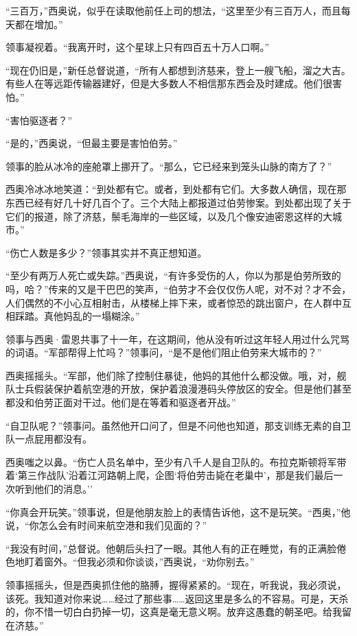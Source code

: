 \documentclass[AutoFakeBold=true]{book}
\begin{document}
``三百万，''西奥说，似乎在读取他前任上司的想法，``这里至少有三百万人，而且每天都在增加。''

领事凝视着。``我离开时，这个星球上只有四百五十万人口啊。''

``现在仍旧是，''新任总督说道，``所有人都想到济慈来，登上一艘飞船，溜之大吉。有些人在等远距传输器建好，但是大多数人不相信那东西会及时建成。他们很害怕。''

``害怕驱逐者？''

``是的，''西奥说，``但最主要是害怕伯劳。''

领事的脸从冰冷的座舱罩上挪开了。``那么，它已经来到笼头山脉的南方了？''

西奥冷冰冰地笑道：``到处都有它。或者，到处都有它们。大多数人确信，现在那东西已经有好几十好几百个了。三个大陆上都报道过伯劳惨案。到处都出现了关于它们的报道，除了济慈，鬃毛海岸的一些区域，以及几个像安迪密恩这样的大城市。''

``伤亡人数是多少？''领事其实并不真正想知道。

``至少有两万人死亡或失踪。''西奥说，``有许多受伤的人，你以为那是伯劳所致的吗，哈？''传来的又是干巴巴的笑声，``伯劳才不会仅仅伤人呢，对不对？才不会，人们偶然的不小心互相射击，从楼梯上摔下来，或者惊恐的跳出窗户，在人群中互相踩踏。真他妈乱的一塌糊涂。''

领事与西奥·雷恩共事了十一年，在这期间，他从没有听过这年轻人用过什么咒骂的词语。``军部帮得上忙吗？''领事问，``是不是他们阻止伯劳来大城市的？''

西奥摇摇头。``军部，他们除了控制住暴徒，他妈的其他什么都没做。哦，对，舰队士兵假装保护着航空港的开放，保护着浪漫港码头停放区的安全。但是他们甚至都没和伯劳正面对干过。他们是在等着和驱逐者开战。''

``自卫队呢？''领事问。虽然他开口问了，但是不问他也知道，那支训练无素的自卫队一点屁用都没有。

西奥嗤之以鼻。``伤亡人员名单中，至少有八千人是自卫队的。布拉克斯顿将军带着`第三作战队'沿着江河路朝上爬，企图`将伯劳击毙在老巢中'，那是我们最后一次听到他们的消息。''

``你真会开玩笑。''领事说，但是他朋友脸上的表情告诉他，这不是玩笑。``西奥，''他说，``你怎么会有时间来航空港和我们见面的？''

``我没有时间，''总督说。他朝后头扫了一眼。其他人有的正在睡觉，有的正满脸倦色地盯着窗外。``但我必须和你谈谈，''西奥说，``劝你别去。''

领事摇摇头，但是西奥抓住他的胳膊，握得紧紧的。``现在，听我说，我必须说，该死。我知道对你来说……经过了那些事……返回这里是多么的不容易。可是，天杀的，你不惜一切白白扔掉一切，这真是毫无意义啊。放弃这愚蠢的朝圣吧。给我留在济慈。''
\end{document}
